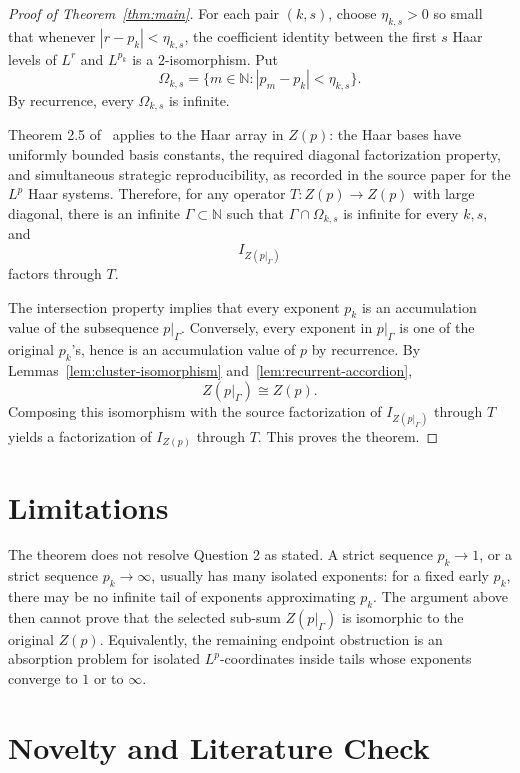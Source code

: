 \documentclass[11pt]{article}
\newcommand{\N}{\mathbb N}
\newcommand{\Id}{I}
\begin{document}
\begin{proof}[Proof of Theorem~\ref{thm:main}]
For each pair \((k,s)\), choose \(\eta_{k,s}>0\) so small that whenever
\(|r-p_k|<\eta_{k,s}\), the coefficient identity between the first \(s\) Haar levels of \(L^{r}\)
and \(L^{p_k}\) is a \(2\)-isomorphism.  Put
\[
  \Omega_{k,s}=\{m\in\N: |p_m-p_k|<\eta_{k,s}\}.
\]
By recurrence, every \(\Omega_{k,s}\) is infinite.

Theorem 2.5 of~\cite{LMMMS} applies to the Haar array in \(Z(p)\): the Haar bases have uniformly
bounded basis constants, the required diagonal factorization property, and simultaneous strategic
reproducibility, as recorded in the source paper for the \(L^p\) Haar systems.  Therefore, for any
operator \(T:Z(p)\to Z(p)\) with large diagonal, there is an infinite
\(\Gamma\subset\N\) such that \(\Gamma\cap\Omega_{k,s}\) is infinite for every \(k,s\), and
\[
  \Id_{Z(p|_\Gamma)}
\]
factors through \(T\).

The intersection property implies that every exponent \(p_k\) is an accumulation value of the
subsequence \(p|_\Gamma\).  Conversely, every exponent in \(p|_\Gamma\) is one of the original
\(p_k\)'s, hence is an accumulation value of \(p\) by recurrence.  By
Lemmas~\ref{lem:cluster-isomorphism} and~\ref{lem:recurrent-accordion},
\[
  Z(p|_\Gamma)\cong Z(p).
\]
Composing this isomorphism with the source factorization of \(\Id_{Z(p|_\Gamma)}\) through \(T\)
yields a factorization of \(\Id_{Z(p)}\) through \(T\).  This proves the theorem.
\end{proof}

\section*{Limitations}

The theorem does not resolve Question 2 as stated.  A strict sequence \(p_k\to1\), or a strict
sequence \(p_k\to\infty\), usually has many isolated exponents: for a fixed early \(p_k\), there may
be no infinite tail of exponents approximating \(p_k\).  The argument above then cannot prove that
the selected sub-sum \(Z(p|_\Gamma)\) is isomorphic to the original \(Z(p)\).  Equivalently, the
remaining endpoint obstruction is an absorption problem for isolated \(L^p\)-coordinates inside
tails whose exponents converge to \(1\) or to \(\infty\).

\section*{Novelty and Literature Check}
\end{document}
